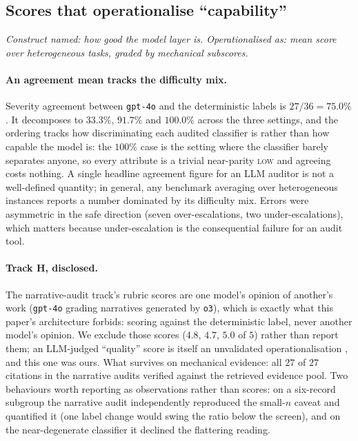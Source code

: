 \documentclass[sigconf,nonacm]{acmart}
\begin{document}
\subsection{Scores that operationalise ``capability''}
\label{sec:capability}

\emph{Construct named: how good the model layer is. Operationalised as: mean
score over heterogeneous tasks, graded by mechanical subscores.}

\paragraph{An agreement mean tracks the difficulty mix.} Severity agreement
between \texttt{gpt-4o} and the deterministic labels is $27/36 = 75.0\%$. It
decomposes to $33.3\%$, $91.7\%$ and $100.0\%$ across the three settings, and
the ordering tracks how discriminating each audited classifier is rather than
how capable the model is: the $100\%$ case is the setting where the classifier
barely separates anyone, so every attribute is a trivial near-parity
\textsc{low} and agreeing costs nothing. A single headline agreement figure
for an LLM auditor is not a well-defined quantity; in general, any benchmark
averaging over heterogeneous instances reports a number dominated by its
difficulty mix. Errors were asymmetric in the safe
direction (seven over-escalations, two under-escalations), which matters
because under-escalation is the consequential failure for an audit tool.

\paragraph{Track H, disclosed.} The narrative-audit track's rubric scores are
one model's opinion of another's work (\texttt{gpt-4o} grading narratives
generated by \texttt{o3}), which is exactly what this paper's architecture
forbids: scoring against the deterministic label, never another model's
opinion. We exclude those scores ($4.8$, $4.7$, $5.0$ of $5$) rather than
report them; an LLM-judged ``quality'' score is itself an unvalidated
operationalisation \citep{zheng2023}, and this one was ours. What survives on
mechanical evidence: all $27$ of $27$ citations in the narrative audits
verified against the retrieved evidence pool. Two behaviours worth reporting
as observations rather than scores: on a six-record subgroup the narrative
audit independently reproduced the small-$n$ caveat and quantified it (one
label change would swing the ratio below the screen), and on the
near-degenerate classifier it declined the flattering reading.
\end{document}
